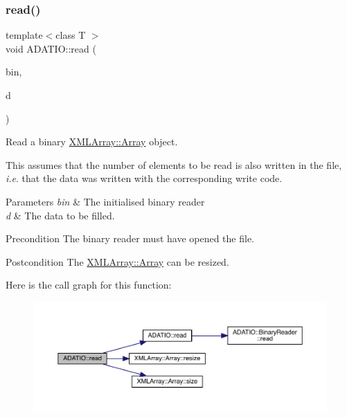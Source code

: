 \subsubsection{\texorpdfstring{read()}{read()}\hspace{0.1cm}{\footnotesize\ttfamily [16/28]}}
{\footnotesize\ttfamily template$<$class T $>$ \\
void A\+D\+A\+T\+I\+O\+::read (\begin{DoxyParamCaption}\item[{\mbox{\hyperlink{classADATIO_1_1BinaryReader}{Binary\+Reader}} \&}]{bin,  }\item[{\mbox{\hyperlink{classXMLArray_1_1Array}{X\+M\+L\+Array\+::\+Array}}$<$ T $>$ \&}]{d }\end{DoxyParamCaption})\hspace{0.3cm}{\ttfamily [inline]}}



Read a binary \mbox{\hyperlink{classXMLArray_1_1Array}{X\+M\+L\+Array\+::\+Array}} object. 

This assumes that the number of elements to be read is also written in the file, {\itshape i.\+e}. that the data was written with the corresponding write code. 
\begin{DoxyParams}{Parameters}
{\em bin} & The initialised binary reader \\
\hline
{\em d} & The data to be filled.\\
\hline
\end{DoxyParams}
\begin{DoxyPrecond}{Precondition}
The binary reader must have opened the file. 
\end{DoxyPrecond}
\begin{DoxyPostcond}{Postcondition}
The \mbox{\hyperlink{classXMLArray_1_1Array}{X\+M\+L\+Array\+::\+Array}} can be resized. 
\end{DoxyPostcond}
Here is the call graph for this function\+:\nopagebreak
\begin{figure}[H]
\begin{center}
\leavevmode
\includegraphics[width=350pt]{d0/dba/namespaceADATIO_a16a912dec3b1d1424a44c9f1a6cd915f_cgraph}
\end{center}
\end{figure}
\mbox{\label{namespaceADATIO_ab39e59b5ba8a584a1c5afd164173b9e7}} 
